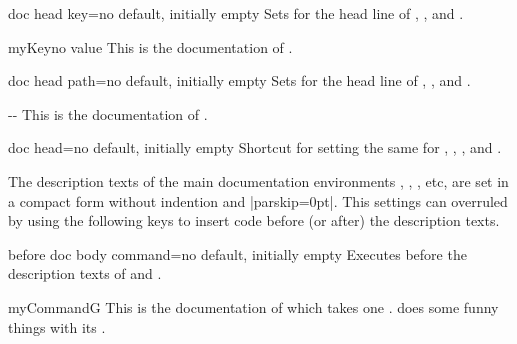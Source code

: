 \begin{docTcbKey}{doc head key}{=}{no default, initially empty}
  Sets  for the head line of
  , , and .
\begin{dispExample}

\begin{docKey}[foo]{myKey}{}{no value}
  This is the documentation of .
\end{docKey}
\end{dispExample}
\end{docTcbKey}


\begin{docTcbKey}[][doc new=2019-09-18]{doc head path}{=}{no default, initially empty}
  Sets  for the head line of
  , , and .
\begin{dispExample}

\begin{docPathOperation*}{-{}-}{}
  This is the documentation of .
\end{docPathOperation*}
\end{dispExample}
\end{docTcbKey}


\begin{docTcbKey}[][doc updated=2019-09-18]{doc head}{=}{no default, initially empty}
  Shortcut for setting the same  for
  , ,
  , and .
\end{docTcbKey}


\clearpage

The description texts of the main documentation environments ,
, , etc, are set in a compact form without
indention and |parskip=0pt|. This settings can overruled by using the following
keys to insert code before (or after) the description texts.

\begin{docTcbKey}[][doc new=2015-10-09]{before doc body command}{=}{no default, initially empty}
  Executes  before the description texts
  of  and .
\begin{dispExample}

\begin{docCommand*}{myCommandG}{}
  This is the documentation of  which takes one .
   does some funny things with its .
\end{docCommand*}
\end{dispExample}
\end{docTcbKey}


